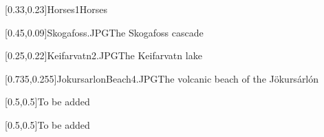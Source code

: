



\graphicspath{{Figures/}{Figures/Iceland/}}


\subtitle{Day 3}
\date{28.10.2020}


    
    [0.33,0.23]{Horses1}{Horses}
    
    
    [0.45,0.09]{Skogafoss.JPG}{The Skogafoss cascade}
    
    [0.25,0.22]{Keifarvatn2.JPG}{The Keifarvatn lake}
    
    [0.735,0.255]{JokursarlonBeach4.JPG}{The volcanic beach of the J\"okurs\'arl\'on}
    
    [0.5,0.5]{}{To be added}
    
    [0.5,0.5]{}{To be added}
    

